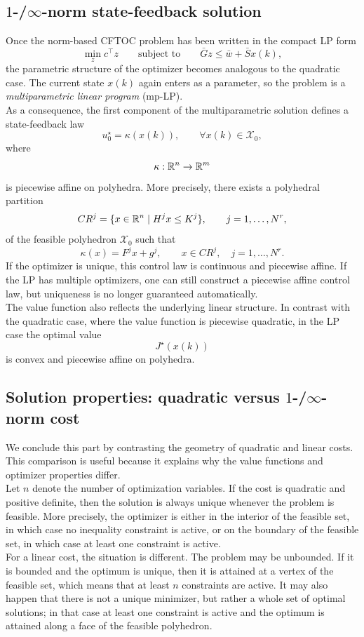 \subsection{\(1\)-/\(\infty\)-norm state-feedback solution}

Once the norm-based CFTOC problem has been written in the compact LP form
\[
\min_z c^\top z
\qquad \text{subject to}\qquad
\bar G z \le \bar w + \bar S x(k),
\]
the parametric structure of the optimizer becomes analogous to the quadratic case. The current
state \(x(k)\) again enters as a parameter, so the problem is a \emph{multiparametric linear
program} (mp-LP).\\
As a consequence, the first component of the multiparametric solution defines a state-feedback
law
\[
u_0^\star=\kappa(x(k)),\qquad \forall x(k)\in\mathcal X_0,
\]
where
\[
\kappa:\mathbb{R}^n\to\mathbb{R}^m
\]
is piecewise affine on polyhedra. More precisely, there exists a polyhedral partition
\[
CR^j=\{x\in\mathbb{R}^n\mid H^j x\le K^j\},\qquad j=1,\dots,N^r,
\]
of the feasible polyhedron \(\mathcal X_0\) such that
\[
\kappa(x)=F^j x + g^j,
\qquad
x\in CR^j,\quad j=1,\dots,N^r.
\]
If the optimizer is unique, this control law is continuous and piecewise affine. If the LP has
multiple optimizers, one can still construct a piecewise affine control law, but uniqueness is no
longer guaranteed automatically.\\
The value function also reflects the underlying linear structure. In contrast with the quadratic
case, where the value function is piecewise quadratic, in the LP case the optimal value
\[
J^\star(x(k))
\]
is convex and piecewise affine on polyhedra.

\subsection{Solution properties: quadratic versus \(1\)-/\(\infty\)-norm cost}

We conclude this part by contrasting the geometry of quadratic and linear costs. This
comparison is useful because it explains why the value functions and optimizer properties differ.\\

Let \(n\) denote the number of optimization variables. If the cost is quadratic and positive
definite, then the solution is always unique whenever the problem is feasible. More precisely,
the optimizer is either in the interior of the feasible set, in which case no inequality constraint
is active, or on the boundary of the feasible set, in which case at least one constraint is active.\\
For a linear cost, the situation is different. The problem may be unbounded. If it is bounded
and the optimum is unique, then it is attained at a vertex of the feasible set, which means that
at least \(n\) constraints are active. It may also happen that there is not a unique minimizer,
but rather a whole set of optimal solutions; in that case at least one constraint is active and the
optimum is attained along a face of the feasible polyhedron.\\

